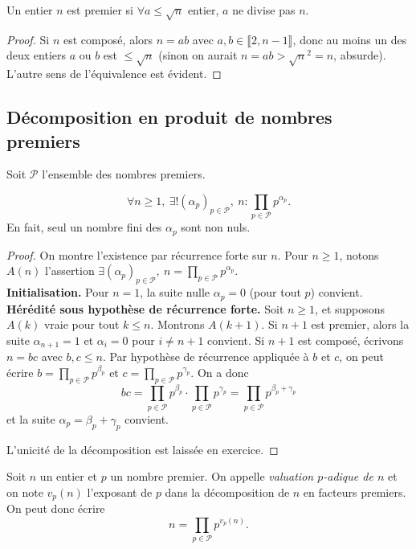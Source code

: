 \begin{proposition}
Un entier $n$ est premier si $\forall a \leq \sqrt n$ entier, $a$ ne divise pas $n$.
\end{proposition}
\begin{proof}
Si $n$ est composé, alors $n=ab$ avec $a, b \in \llbracket 2,n-1 \rrbracket$, donc au moins un des deux entiers $a$ ou $b$ est $\leq\sqrt n$ (sinon on aurait $n=ab > \sqrt{n}^2=n$, absurde). L'autre sens de l'équivalence est évident.
\end{proof}



\subsection{Décomposition en produit de nombres premiers}
Soit $\mathcal P$ l'ensemble des nombres premiers.

\begin{proposition}
\[
\forall n\geq 1, \: \exists !  (\alpha_p)_{p\in \mathcal P}, \: n : \prod_{p\in \mathcal P} p^{\alpha_p}.
\]
En fait, seul un nombre fini des $\alpha_p$ sont non nuls.
\end{proposition}
\begin{proof}
On montre l'existence par récurrence forte sur $n$. Pour $n\geq 1$, notons $A(n)$ l'assertion  $\exists  (\alpha_p)_{p\in \mathcal P}, \: n = \prod_{p\in \mathcal P} p^{\alpha_p}$.\\

\textbf{Initialisation.} Pour $n=1$, la suite nulle $\alpha_p = 0$ (pour tout $p$) convient.\\

\textbf{Hérédité sous hypothèse de récurrence forte.} Soit $n\geq 1$, et supposons $A(k)$ vraie pour tout $k\leq n$. Montrons $A(k+1)$. Si $n+1$ est premier, alors la suite $\alpha_{n+1}=1$ et $\alpha_i=0$ pour $i\neq n+1$ convient. Si $n+1$ est composé, écrivons $n=bc$ avec $b,c\leq n$. Par hypothèse de récurrence appliquée à $b$ et $c$, on peut écrire $b=\prod_{p\in \mathcal P} p^{\beta_p}$ et $c=\prod_{p\in \mathcal P} p^{\gamma_p}$. On a donc 
\[ bc = \prod_{p\in \mathcal P} p^{\beta_p} \cdot \prod_{p\in \mathcal P} p^{\gamma_p}
= \prod_{p\in \mathcal P} p^{\beta_p+\gamma_p}\] et la suite $\alpha_p = \beta_p+\gamma_p$ convient.

L'unicité de la décomposition est laissée en exercice.
\end{proof}

\begin{definition}
Soit $n$ un entier et $p$ un nombre premier. On appelle \emph{valuation $p$-adique de $n$} et on note $v_p(n)$ l'exposant de $p$ dans la décomposition de $n$ en facteurs premiers. On peut donc écrire 
\[ n = \prod_{p\in \mathcal P} p^{v_p(n)}.\]
\end{definition}

